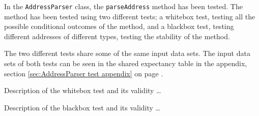 In the \texttt{AddressParser} class, the \texttt{parseAddress} method has been tested. The method has been tested using two different tests; a whitebox test, testing all the possible conditional outcomes of the method, and a blackbox test, testing different addresses of different types, testing the stability of the method.

The two different tests share some of the same input data sets. The input data sets of both tests can be seen in the shared expectancy table in the appendix, section \ref{sec:AddressParser test appendix} on page \pageref{sec:AddressParser test appendix}.

Description of the whitebox test and its validity \ldots

Description of the blackbox test and its validity \ldots
